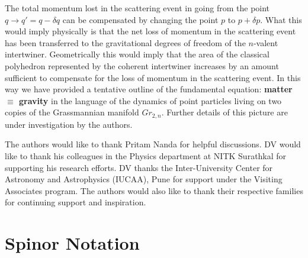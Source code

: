 \documentclass[twocolumn,final,aps,nofootinbib,nobibnotes]{revtex4-2}
\begin{document}
The total momentum lost in the scattering event in going from the point $ q \rightarrow q' = q - \delta q $ can be compensated by changing the point $ p $ to $ p + \delta p $. What this would imply physically is that the net loss of momentum in the scattering event has been transferred to the gravitational degrees of freedom of the $ n $-valent intertwiner. Geometrically this would imply that the area of the classical polyhedron represented by the coherent intertwiner increases by an amount sufficient to compensate for the loss of momentum in the scattering event. In this way we have provided a tentative outline of the fundamental equation: \textbf{matter $ \equiv $ gravity} in the language of the dynamics of point particles living on two copies of the Grassmannian manifold $ Gr_{2,n} $. Further details of this picture are under investigation by the authors.

\begin{acknowledgements}
	The authors would like to thank Pritam Nanda for helpful discussions. DV would like to thank his colleagues in the Physics department at NITK Surathkal for supporting his research efforts. DV thanks the Inter-University Center for Astronomy and Astrophysics (IUCAA), Pune for support under the Visiting Associates program. The authors would also like to thank their respective families for continuing support and inspiration.
\end{acknowledgements}

\appendix

\section{Spinor Notation}\label{sec:spinor-notation}
\end{document}
